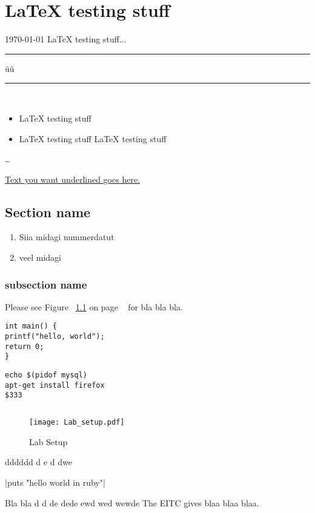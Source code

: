 \chapter{LaTeX testing stuff}
\label{LaTeX testing stuff}
{\huge\today}
LaTeX testing stuff...
\rule{2.6cm}{0.75pt}  \hspace{3cm} üü \rule{3cm}{0.75pt}\\[2cm]
\begin{itemize}
	\item LaTeX testing stuff
	\item LaTeX testing stuff LaTeX testing stuff
\end{itemize}

\ldots
{}


\underline{Text you want underlined goes here.}


\section{Section name}
\begin{enumerate}
	\item Siia midagi nummerdatut
	\item veel midagi
\end{enumerate}
\subsection{subsection name}
Please see Figure ~\ref{Lab Setup} on page ~\pageref{Lab Setup} for bla bla bla.

\begin{verbatim}
int main() {
printf("hello, world");
return 0;
}
\end{verbatim}
\begin{verbatim}
echo $(pidof mysql)
apt-get install firefox
$333
\end{verbatim}
\inputminted{sh}{code/simple.sh}

\begin{figure}
    \centering
	\texttt{[image: Lab\_setup.pdf]}
	\caption{Lab Setup}
	\label{Lab Setup}
\end{figure}


dddddd d  e d dwe \

|puts "hello world in ruby"|\

\cite{website:ssl} Bla bla
\citep{book:code-complete} d  d
\citep{OppeArenduskeskus2010} de dede
\cite{url:pulse} ewd wed
\citep{SecEngineering} wewde
The \gls{EITC} gives blaa blaa blaa.
